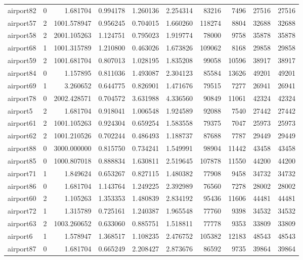 \begin{longtable}{|l|r|r|r|r|r|r|r|r|r|}
airport82 & 0 & 1.681704 & 0.994178 & 1.260136 & 2.254314 & 83216 & 7496 & 27516 & 27516 \\
airport57 & 2 & 1001.578947 & 0.956245 & 0.704015 & 1.660260 & 118274 & 8804 & 32688 & 32688 \\
airport58 & 2 & 2001.105263 & 1.124751 & 0.795023 & 1.919774 & 78000 & 9758 & 35878 & 35878 \\
airport68 & 1 & 1001.315789 & 1.210800 & 0.463026 & 1.673826 & 109062 & 8168 & 29858 & 29858 \\
airport59 & 2 & 1001.681704 & 0.807013 & 1.028195 & 1.835208 & 99058 & 10596 & 38917 & 38917 \\
airport84 & 0 & 1.157895 & 0.811036 & 1.493087 & 2.304123 & 85584 & 13626 & 49201 & 49201 \\
airport69 & 1 & 3.260652 & 0.644775 & 0.826901 & 1.471676 & 79515 & 7277 & 26941 & 26941 \\
airport78 & 0 & 2002.428571 & 0.704572 & 3.631988 & 4.336560 & 90849 & 11061 & 42324 & 42324 \\
airport5 & 2 & 1.681704 & 0.918041 & 1.006548 & 1.924589 & 92088 & 7540 & 27442 & 27442 \\
airport61 & 2 & 1001.105263 & 0.924304 & 0.659254 & 1.583558 & 79375 & 7047 & 25973 & 25973 \\
airport62 & 2 & 1001.210526 & 0.702244 & 0.486493 & 1.188737 & 87688 & 7787 & 29449 & 29449 \\
airport88 & 0 & 3000.000000 & 0.815750 & 0.734241 & 1.549991 & 98904 & 11442 & 43458 & 43458 \\
airport85 & 0 & 1000.807018 & 0.888834 & 1.630811 & 2.519645 & 107878 & 11550 & 44200 & 44200 \\
airport71 & 1 & 1.849624 & 0.653267 & 0.827115 & 1.480382 & 77908 & 9458 & 34732 & 34732 \\
airport86 & 0 & 1.681704 & 1.143764 & 1.249225 & 2.392989 & 76560 & 7278 & 28002 & 28002 \\
airport60 & 2 & 1.105263 & 1.353353 & 1.480839 & 2.834192 & 95436 & 11606 & 44481 & 44481 \\
airport72 & 1 & 1.315789 & 0.725161 & 1.240387 & 1.965548 & 77760 & 9398 & 34532 & 34532 \\
airport63 & 2 & 1003.260652 & 0.633060 & 0.885751 & 1.518811 & 77778 & 9353 & 33809 & 33809 \\
airport6 & 1 & 1.578947 & 1.368517 & 1.108235 & 2.476752 & 105382 & 12183 & 48543 & 48543 \\
airport87 & 0 & 1.681704 & 0.665249 & 2.208427 & 2.873676 & 86592 & 9735 & 39864 & 39864 \\

\end{longtable}
